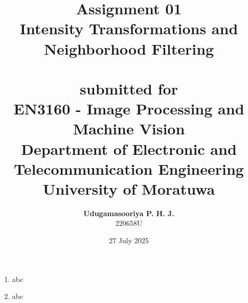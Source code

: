 \documentclass{article}[a4paper]
\title{
	\huge{\textbf{
		Assignment 01
	}}\\
	\Large{
		Intensity Transformations and Neighborhood Filtering
	}\\
	\phantom{}\\
	\large{
		submitted for
	}\\
	\Large{
		\textbf{EN3160 - Image Processing and Machine Vision}
	}\\
	\large{
		Department of Electronic and Telecommunication Engineering
	}
	\\
	\large{University of Moratuwa}
}
\author{
	\textbf{Udugamasooriya P. H. J.}\\
	220658U\\
}
\date{27 July 2025}
\begin{document}
\maketitle

\begin{enumerate}
	\item abc

	\item abc
\end{enumerate}
\end{document}
